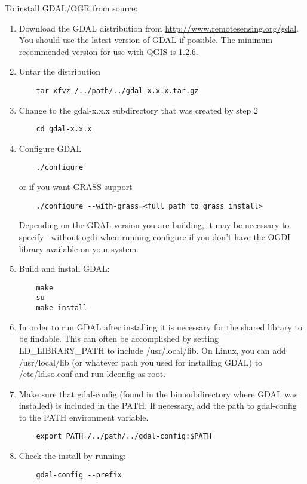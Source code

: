   To install GDAL/OGR from source:
  \begin{enumerate}
  \item Download the GDAL distribution from
  \url{http://www.remotesensing.org/gdal}. You should use the latest
  version of GDAL if possible. The minimum recommended version for use
  with QGIS is 1.2.6. 

  \item Untar the distribution 
  \begin{verbatim}
    tar xfvz /../path/../gdal-x.x.x.tar.gz
  \end{verbatim}

  \item Change to the gdal-x.x.x subdirectory that was created by step 2
  \begin{verbatim}
    cd gdal-x.x.x
  \end{verbatim}

  \item Configure GDAL
  \begin{verbatim}
    ./configure 
  \end{verbatim}
  or if you want GRASS support
  \begin{verbatim}
    ./configure --with-grass=<full path to grass install>
  \end{verbatim}
  Depending on the GDAL version you are building, it may be necessary to
  specify --without-ogdi when running configure if you don't have the OGDI
  library available on your system.

  \item Build and install GDAL:
  \begin{verbatim}
    make
    su
    make install
  \end{verbatim}

  \item In order to run GDAL after installing it is necessary for the shared
  library to be findable. This can often be accomplished by setting
  LD\_LIBRARY\_PATH to include /usr/local/lib. On Linux, you can add
  /usr/local/lib (or whatever path you used for installing GDAL) to
  /etc/ld.so.conf and run ldconfig as root.

  \item Make sure that gdal-config (found in the bin subdirectory where GDAL was installed) is included in the PATH. If necessary, add the path to gdal-config to the PATH environment variable.
  \begin{verbatim}
    export PATH=/../path/../gdal-config:$PATH
  \end{verbatim}

  \item Check the install by running:
  \begin{verbatim}
    gdal-config --prefix
  \end{verbatim}

  \end{enumerate}

